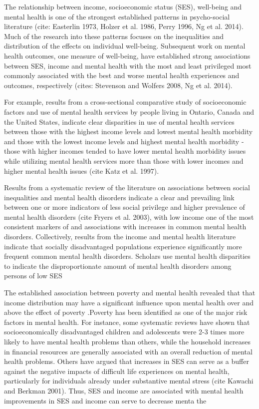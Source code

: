 \documentclass{article}
\begin{document}
The relationship between income, socioeconomic status (SES), well-being and mental health is one of the strongest established patterns in psycho-social literature (cite: Easterlin 1973, Holzer et al. 1986, Perry 1996, Ng et al. 2014). Much of the research into these patterns focuses on the inequalities and distribution of the effects on individual well-being. Subsequent work on mental health outcomes, one measure of well-being, have established strong associations between SES, income and mental health with the most and least privileged most commonly associated with the best and worse mental health experiences and outcomes, respectively (cites: Stevenson and Wolfers 2008, Ng et al. 2014). 

For example, results from a cross-sectional comparative study of socioeconomic factors and use of mental health services by people living in Ontario, Canada and the United States, indicate clear disparities in use of mental health services between those with the highest income levels and lowest mental health morbidity and those with the lowest income levels and highest mental health morbidity - those with higher incomes tended to have lower mental health morbidity issues while utilizing mental health services more than those with lower incomes and higher mental health issues (cite Katz et al. 1997). 

Results from a systematic review of the literature on associations between social inequalities and mental health disorders indicate a clear and prevailing link between  one or more indicators of less social privilege and higher prevalence of mental health disorders (cite Fryers et al. 2003), with low income one of the most consistent markers of and associations with increases in common mental health disorders. Collectively, results from the income and mental health literature indicate that socially disadvantaged populations experience significantly more frequent common mental health disorders. Scholars use mental health disparities to indicate the disproportionate amount of mental health disorders among persons of low SES\citep{RN1292}

The established association between poverty and mental health revealed that that income distribution may have a significant influence upon mental health over and above the effect of poverty \citep{HANANDITA201459}.Poverty has been identified as one of the major risk factors in mental health. For instance, some systematic reviews have shown that socioeconomically disadvantaged children and adolescents were 2-3 times more likely to have mental health problems than others\citep{REISS201324}, while the household increases in financial resources are generally associated with an overall reduction of mental health problems\citep{2015Does}. Others have argued that increases in SES can serve as a buffer against the negative impacts of difficult life experiences on mental health, particularly for individuals already under substantive mental stress (cite Kawachi and Berkman 2001). Thus, SES and income are associated with mental health improvements in SES and income can serve to decrease menta the 
\end{document}
